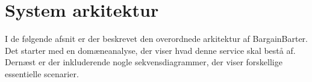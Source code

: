 \chapter{System arkitektur}
I de følgende afsnit er der beskrevet den overordnede arkitektur af BargainBarter. Det starter med en domæneanalyse, der viser hvad denne service skal bestå af. Dernæst er der inkluderende nogle sekvensdiagrammer, der viser forskellige essentielle scenarier. 